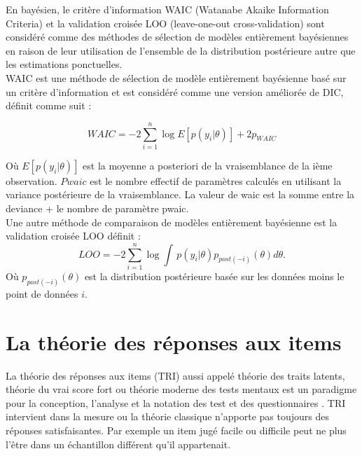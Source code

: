\noindent En bayésien, le critère d'information WAIC (Watanabe Akaike Information Criteria) et la validation croisée LOO (leave-one-out cross-validation) sont considéré comme des méthodes de sélection de modèles entièrement bayésiennes en raison de leur utilisation de l'ensemble de la distribution postérieure autre que les estimations ponctuelles. \\

\noindent WAIC \cite{watanabe2010asymptotic} est une méthode de sélection de modèle entièrement bayésienne basé sur un critère d'information et est considéré comme une version améliorée de DIC, définit comme suit :

\begin{equation}
	WAIC = -2\sum_{i=1}^{n} \log E\left[ p(y_{i}|\theta) \right] + 2p_{WAIC}
	\label{waic_formula}
\end{equation}

Où \(\displaystyle E\left[ p(y_{i}|\theta) \right] \) est la moyenne a posteriori de la vraisemblance de la ième observation.
\(\displaystyle Pwaic \)  est le nombre effectif de paramètres calculés en utilisant la variance postérieure de la vraisemblance.
La valeur de waic est la somme entre la deviance + le nombre de paramètre pwaic. \\

\noindent Une autre méthode de comparaison de modèles entièrement bayésienne est la validation croisée LOO \cite{geisser1979predictive} définit : \\

\begin{equation}
	LOO = -2\sum_{i=1}^{n} \log \int \,p(y_{i}|\theta)p_{post(-i)}(\theta)d\theta.
	\label{loo_formula}
\end{equation}
 Où \(\displaystyle p_{post(-i)}(\theta) \) est la distribution postérieure basée sur les données moins le point de données \(\displaystyle i \).
\section{La théorie des réponses aux items}
La théorie des réponses aux items (TRI) aussi appelé théorie des traits latents, théorie du vrai score fort ou théorie moderne des tests mentaux est un paradigme pour la conception, l’analyse et la notation des test et des questionnaires \cite{fisher1922mathematical}. TRI intervient dans la mesure ou la théorie classique n’apporte pas toujours des réponses satisfaisantes. Par exemple un item jugé facile ou difficile peut ne plus l’être dans un échantillon différent qu’il appartenait.


